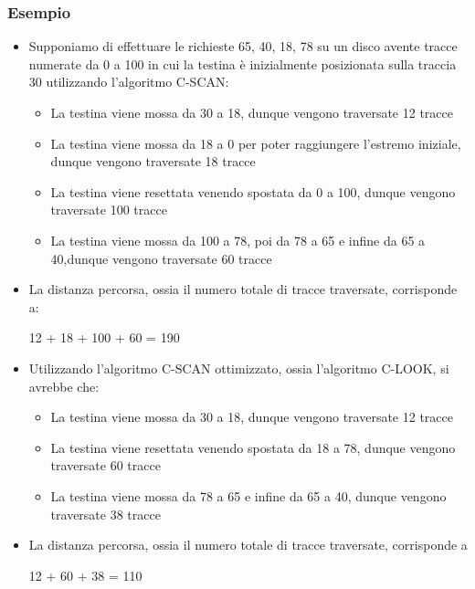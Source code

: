 \documentclass{article}
\begin{document}
\subsubsection{Esempio}
\begin{itemize}
    \item Supponiamo di effettuare le richieste 65, 40, 18, 78 su un disco avente tracce numerate da 0 a 100 in cui la testina è inizialmente posizionata sulla traccia 30 utilizzando l'algoritmo C-SCAN:
    \begin{itemize}
        \item La testina viene mossa da 30 a 18, dunque vengono traversate 12 tracce
        \item La testina viene mossa da 18 a 0 per poter raggiungere l'estremo iniziale,
        dunque vengono traversate 18 tracce
        \item La testina viene resettata venendo spostata da 0 a 100, dunque vengono traversate 100 tracce
        \item La testina viene mossa da 100 a 78, poi da 78 a 65 e infine da 65 a 40,dunque vengono traversate 60 tracce
    \end{itemize}
    \item La distanza percorsa, ossia il numero totale di tracce traversate, corrisponde a:
    \begin{center}
        12 + 18 + 100 + 60 = 190
    \end{center}
    \item Utilizzando l'algoritmo C-SCAN ottimizzato, ossia l'algoritmo C-LOOK, si avrebbe che:
    \begin{itemize}
        \item La testina viene mossa da 30 a 18, dunque vengono traversate 12 tracce
        \item La testina viene resettata venendo spostata da 18 a 78, dunque vengono traversate 60 tracce
        \item La testina viene mossa da 78 a 65 e infine da 65 a 40, dunque vengono traversate 38 tracce 
    \end{itemize}
    \item La distanza percorsa, ossia il numero totale di tracce traversate, corrisponde a
    \begin{center}
        12 + 60 + 38 = 110
    \end{center}
\end{itemize}
\end{document}
